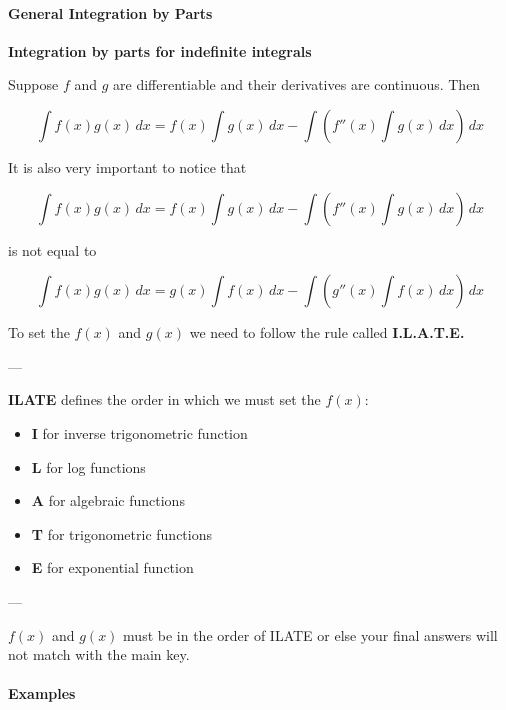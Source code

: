 \paragraph{General Integration by Parts}



\textbf{Integration by parts for indefinite integrals}  

Suppose $f$ and $g$ are differentiable and their derivatives are continuous. Then



$$\int f(x)g(x) \, dx = f(x) \int g(x) \, dx - \int \left(f''(x) \int g(x) \, dx\right) \, dx$$



It is also very important to notice that



$$\int f(x)g(x) \, dx = f(x) \int g(x) \, dx - \int \left(f''(x) \int g(x) \, dx\right) \, dx$$



is not equal to



$$\int f(x)g(x) \, dx = g(x) \int f(x) \, dx - \int \left(g''(x) \int f(x) \, dx\right) \, dx$$



To set the $f(x)$ and $g(x)$ we need to follow the rule called \textbf{I.L.A.T.E.}



---



\textbf{ILATE} defines the order in which we must set the $f(x)$:



\begin{itemize}
    \item \textbf{I} for inverse trigonometric function
    \item \textbf{L} for log functions
    \item \textbf{A} for algebraic functions
    \item \textbf{T} for trigonometric functions
    \item \textbf{E} for exponential function
\end{itemize}

---



$f(x)$ and $g(x)$ must be in the order of ILATE or else your final answers will not match with the main key.



\paragraph{Examples}



